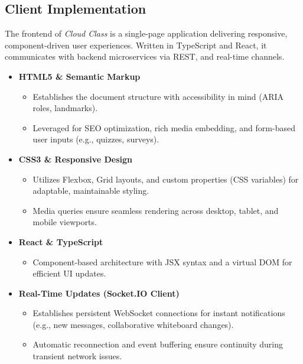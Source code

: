 \subsection{Client Implementation}

The frontend of \emph{Cloud Class} is a single-page application delivering responsive, component-driven user experiences.  Written in TypeScript and React, it communicates with backend microservices via REST, and real-time channels.

\begin{itemize}
  \item \textbf{HTML5 \& Semantic Markup}  
    \begin{itemize}
      \item Establishes the document structure with accessibility in mind (ARIA roles, landmarks).  
      \item Leveraged for SEO optimization, rich media embedding, and form-based user inputs (e.g., quizzes, surveys).
    \end{itemize}

  \item \textbf{CSS3 \& Responsive Design}  
    \begin{itemize}
      \item Utilizes Flexbox, Grid layouts, and custom properties (CSS variables) for adaptable, maintainable styling.  
      \item Media queries ensure seamless rendering across desktop, tablet, and mobile viewports.
    \end{itemize}

  \item \textbf{React \& TypeScript}  
    \begin{itemize}
      \item Component-based architecture with JSX syntax and a virtual DOM for efficient UI updates.  
    \end{itemize}

  \item \textbf{Real-Time Updates (Socket.IO Client)}  
    \begin{itemize}
      \item Establishes persistent WebSocket connections for instant notifications (e.g., new messages, collaborative whiteboard changes).  
      \item Automatic reconnection and event buffering ensure continuity during transient network issues.
    \end{itemize}
\end{itemize}


